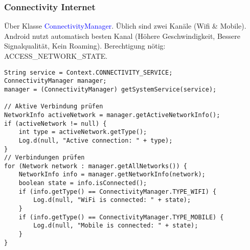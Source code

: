 \subsubsection{Connectivity Internet}
Über Klasse \textcolor{blue}{ConnectivityManager}. Üblich sind zwei Kanäle (Wifi \& Mobile). Android nutzt automatisch besten Kanal (Höhere Geschwindigkeit, Bessere Signalqualität, Kein Roaming). Berechtigung nötig: ACCESS\_NETWORK\_STATE.
\begin{lstlisting}
String service = Context.CONNECTIVITY_SERVICE;
ConnectivityManager manager;
manager = (ConnectivityManager) getSystemService(service);

// Aktive Verbindung prüfen
NetworkInfo activeNetwork = manager.getActiveNetworkInfo();
if (activeNetwork != null) {
    int type = activeNetwork.getType();
    Log.d(null, "Active connection: " + type);
}
// Verbindungen prüfen
for (Network network : manager.getAllNetworks()) {
    NetworkInfo info = manager.getNetworkInfo(network);
    boolean state = info.isConnected();
    if (info.getType() == ConnectivityManager.TYPE_WIFI) {
        Log.d(null, "WiFi is connected: " + state);
    }
    if (info.getType() == ConnectivityManager.TYPE_MOBILE) {
        Log.d(null, "Mobile is connected: " + state);
    }
}
\end{lstlisting}